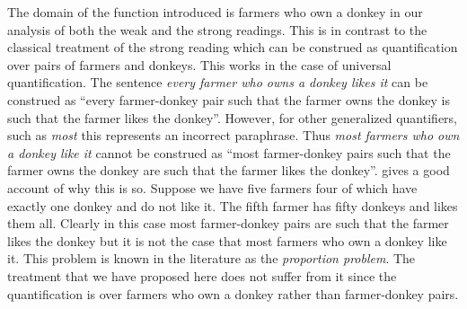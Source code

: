  

The domain of the function introduced is farmers who own a donkey in
our analysis of both the weak and the strong readings.  This is in
contrast to the classical treatment of the strong reading
\citep{Geach1962,KampReyle1993} which can be construed as 
quantification over pairs of farmers and donkeys.  This works in the
case of universal quantification. The sentence \textit{every farmer
  who owns a donkey likes it} can be construed as ``every
farmer-donkey pair such that the farmer owns the donkey is such that
the farmer likes the donkey''.  However, for other generalized
quantifiers, such as \textit{most} this represents an incorrect
paraphrase.  Thus \textit{most farmers who own a donkey like it}
cannot be construed as ``most farmer-donkey pairs such that the farmer
owns the donkey are such that the farmer likes the donkey''.
\cite{Chierchia1995} gives a good account of why this is so.  Suppose
we have five farmers four of which have exactly one donkey and do not
like it.  The fifth farmer has fifty donkeys and likes them all.
Clearly in this case most farmer-donkey pairs are such that the farmer
likes the donkey but it is not the case that most farmers who own a
donkey like it.  This problem is known in the literature as the
\textit{proportion problem}.  The treatment that we have proposed here
does not suffer from it since the quantification is over farmers who
own a donkey rather than farmer-donkey pairs. 
    
 
